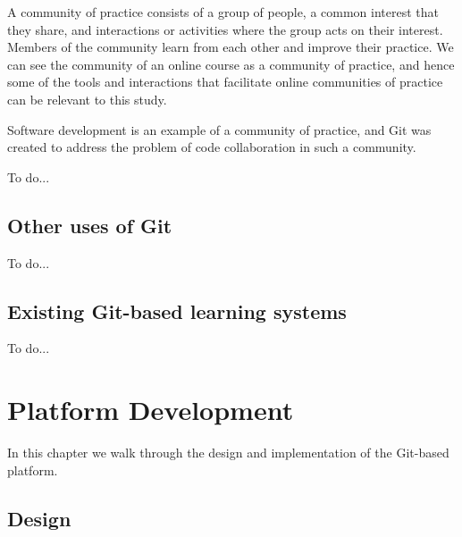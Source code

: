 \documentclass[12pt,twoside,vi]{mitthesis}
\newcommand{\wip}[1]{{\color{red} To do...}}
\begin{document}
A community of practice consists of a group of people, a common interest that they share, and interactions or activities where the group acts on their interest. Members of the community learn from each other and improve their practice. We can see the community of an online course as a community of practice, and hence some of the tools and interactions that facilitate online communities of practice can be relevant to this study.~\cite{teachingdigital}

Software development is an example of a community of practice, and Git was created to address the problem of code collaboration in such a community. 



\wip{Use of group chats such as gitter and mattermost to complement projects}

\section{Other uses of Git}

\wip{While Git was initially created for and has been largely relied on by the software development community, its use has spread to other knowledge workers.

An example of applying Git to a traditional use case is cookbooks: a service called Fork the Cookbook exists in which users can fork, or copy, an existing recipe and tweak it to make it their own. This creates a collaborative and decentralized platform for sharing cooking recipes.~\cite{forkthecookbook}

Example applications include recipes, legislation, datasets, general CMS, etc.}

\section{Existing Git-based learning systems}

\wip{look through references}

\chapter{Platform Development}

In this chapter we walk through the design and implementation of the Git-based platform. 

\section{Design}
\end{document}
